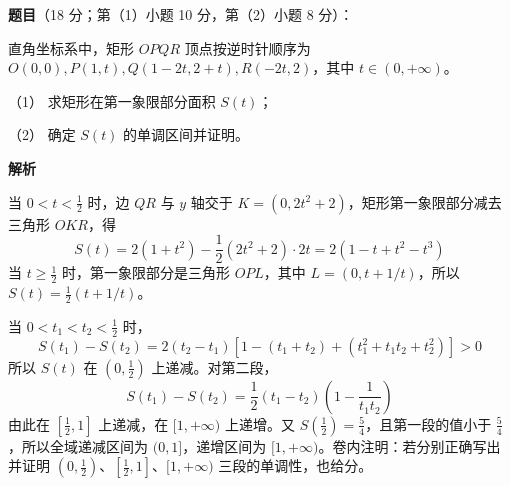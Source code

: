 \begin{answer}

\textbf{题目}（18 分；第（1）小题 10 分，第（2）小题 8 分）：

直角坐标系中，矩形 \(OPQR\) 顶点按逆时针顺序为 \(O(0,0),P(1,t),\mathord{Q(1-2t,2+t)},R(-2t,2)\)，其中 \(t\in(0,+\infty)\)。

（1） 求矩形在第一象限部分面积 \(S(t)\)；

（2） 确定 \(S(t)\) 的单调区间并证明。

\textbf{解析}


当 \(0<t<\frac12\) 时，边 \(QR\) 与 \(y\) 轴交于 \(K=(0,2t^2+2)\)，矩形第一象限部分减去三角形 \(OKR\)，得
\nopagebreak[4]
\[
S(t)=2(1+t^2)-\frac12(2t^2+2)\cdot2t=2(1-t+t^2-t^3)
\]
当 \(t\ge\frac12\) 时，第一象限部分是三角形 \(OPL\)，其中 \(L=(0,t+1/t)\)，所以 \(S(t)=\frac12(t+1/t)\)。


当 \(0<t_1<t_2<\frac12\) 时，
\nopagebreak[4]
\[
S(t_1)-S(t_2)=2(t_2-t_1)\left[1-(t_1+t_2)+(t_1^2+t_1t_2+t_2^2)\right]>0
\]
所以 \(S(t)\) 在 \((0,\frac12)\) 上递减。对第二段，
\nopagebreak[4]
\[
S(t_1)-S(t_2)=\frac12(t_1-t_2)\left(1-\frac1{t_1t_2}\right)
\]
由此在 \([\frac12,1]\) 上递减，在 \([1,+\infty)\) 上递增。又 \(S(\frac12)=\frac54\)，且第一段的值小于 \(\frac54\)，所以全域递减区间为 \((0,1]\)，递增区间为 \([1,+\infty)\)。卷内注明：若分别正确写出并证明 \((0,\frac12)\)、\([\frac12,1]\)、\([1,+\infty)\) 三段的单调性，也给分。


\gkanswer{答案（2）：递减区间 \((0,1]\)，递增区间 \([1,+\infty)\)}

\end{answer}
